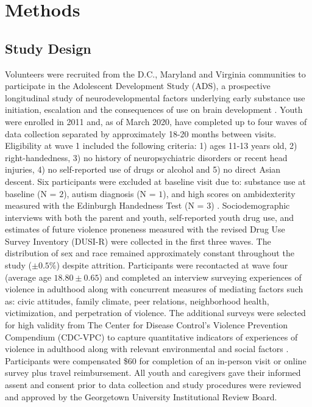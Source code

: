 \documentclass[utf8]{article}
\begin{document}
\section{Methods}
\subsection{Study Design} 
Volunteers were recruited from the D.C., Maryland and Virginia communities to participate in the Adolescent Development Study (ADS), a prospective longitudinal study of neurodevelopmental factors underlying early substance use initiation, escalation and the consequences of use on brain development \citep{Fishbein2016}. Youth were enrolled in 2011 and, as of March 2020, have completed up to four waves of data collection separated by approximately 18-20 months between visits. Eligibility at wave 1 included the following criteria: 1) ages 11-13 years old, 2) right-handedness, 3) no history of neuropsychiatric disorders or recent head injuries, 4) no self-reported use of drugs or alcohol and 5) no direct Asian descent. Six participants were excluded at baseline visit due to: substance use at baseline (N = $2$), autism diagnosis (N = $1$), and high scores on ambidexterity measured with the Edinburgh Handedness Test (N = $3$) \citep{veale2014edinburgh}. Sociodemographic interviews with both the parent and youth, self-reported youth drug use, and estimates of future violence proneness measured with the revised Drug Use Survey Inventory (DUSI-R) \citep{tarter1994reliability} were collected in the first three waves. The distribution of sex and race remained approximately constant throughout the study ($\pm0.5\%$) despite attrition. Participants were recontacted at wave four (average age $18.80\pm0.65$) and completed an interview surveying experiences of violence in adulthood along with concurrent measures of mediating factors such as: civic attitudes, family climate, peer relations, neighborhood health, victimization, and perpetration of violence. The additional surveys were selected for high validity from The Center for Disease Control’s Violence Prevention Compendium (CDC-VPC) to capture quantitative indicators of experiences of violence in adulthood along with relevant environmental and social factors \citep{dahlberg2005measuring}. Participants were compensated \$$60$ for completion of an in-person visit or online survey plus travel reimbursement. All youth and caregivers gave their informed assent and consent prior to data collection and study procedures were reviewed and approved by the Georgetown University Institutional Review Board.
\end{document}

